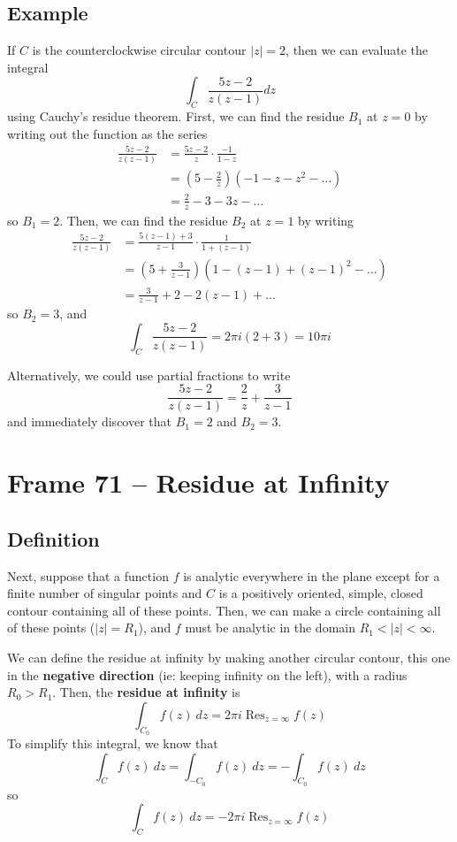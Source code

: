 \documentclass{article}
\renewcommand{\emph}{\textbf}
\DeclareMathOperator{\Res}{Res}
\begin{document}
\subsection{Example}
If $C$ is the counterclockwise circular contour $|z| = 2$, then we can evaluate the integral
\[
	\int_C \frac{5z - 2}{z(z - 1)} dz
\]
using Cauchy's residue theorem. First, we can find the residue $B_1$ at $z = 0$ by writing out the function as the series
\begin{align*}
	\frac{5z - 2}{z(z - 1)}
	&= \frac{5z - 2}{z} \cdot \frac{-1}{1 - z} \\
	&= \left( 5 - \frac{2}{z} \right) (-1 - z - z^2 - \dots) \\
	&= \frac{2}{z} - 3 - 3z - \dots
\end{align*}
so $B_1 = 2$. Then, we can find the residue $B_2$ at $z = 1$ by writing
\begin{align*}
	\frac{5z - 2}{z(z - 1)}
	&= \frac{5(z - 1) + 3}{z - 1} \cdot \frac{1}{1 + (z - 1)} \\
	&= \left( 5 + \frac{3}{z - 1} \right) (1 - (z-1) + (z-1)^2 - \dots) \\
	&= \frac{3}{z - 1} + 2 - 2(z - 1) + \dots
\end{align*}
so $B_2 = 3$, and
\[
	\int_C \frac{5z - 2}{z(z - 1)}
	= 2\pi i(2 + 3)
	= 10\pi i
\]

Alternatively, we could use partial fractions to write
\[	
	\frac{5z - 2}{z(z - 1)} = \frac{2}{z} + \frac{3}{z-1}
\]
and immediately discover that $B_1 = 2$ and $B_2 = 3$.


\clearpage
\section{Frame 71 -- Residue at Infinity}
\subsection{Definition}
Next, suppose that a function $f$ is analytic everywhere in the plane except for a finite number of singular points and $C$ is a positively oriented, simple, closed contour containing all of these points. Then, we can make a circle containing all of these points ($|z| = R_1$), and $f$ must be analytic in the domain $R_1 < |z| < \infty$. 

We can define the residue at infinity by making another circular contour, this one in the \emph{negative direction} (ie: keeping infinity on the left), with a radius $R_0 > R_1$. Then, the \emph{residue at infinity} is
\[
	\int_{C_0} f(z)~dz = 2\pi i \Res_{z = \infty} f(z)
\]
To simplify this integral, we know that
\[
	\int_C f(z)~dz = \int_{-C_0} f(z)~dz = -\int_{C_0} f(z)~dz
\]
so
\[
	\int_C f(z)~dz = -2\pi i \Res_{z = \infty} f(z)
\]
\end{document}
